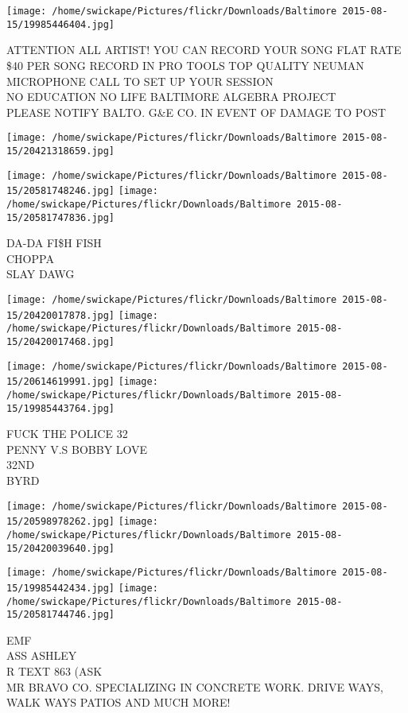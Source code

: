 \documentclass[10pt,letterpaper]{article}
\begin{document}
\texttt{[image: /home/swickape/Pictures/flickr/Downloads/Baltimore 2015-08-15/19985446404.jpg]}

ATTENTION ALL ARTIST!  YOU CAN RECORD YOUR SONG FLAT RATE \$40 PER SONG RECORD IN PRO TOOLS TOP QUALITY NEUMAN MICROPHONE CALL TO SET UP YOUR SESSION\\
NO EDUCATION NO LIFE BALTIMORE ALGEBRA PROJECT\\
PLEASE NOTIFY BALTO. G\&E CO. IN EVENT OF DAMAGE TO POST
\pagebreak

\texttt{[image: /home/swickape/Pictures/flickr/Downloads/Baltimore 2015-08-15/20421318659.jpg]}

\vspace{0.25in}
\texttt{[image: /home/swickape/Pictures/flickr/Downloads/Baltimore 2015-08-15/20581748246.jpg]}
\texttt{[image: /home/swickape/Pictures/flickr/Downloads/Baltimore 2015-08-15/20581747836.jpg]}

DA{-}DA FI\$H FISH\\
CHOPPA\\
SLAY DAWG
\pagebreak

\texttt{[image: /home/swickape/Pictures/flickr/Downloads/Baltimore 2015-08-15/20420017878.jpg]}
\texttt{[image: /home/swickape/Pictures/flickr/Downloads/Baltimore 2015-08-15/20420017468.jpg]}

\texttt{[image: /home/swickape/Pictures/flickr/Downloads/Baltimore 2015-08-15/20614619991.jpg]}
\texttt{[image: /home/swickape/Pictures/flickr/Downloads/Baltimore 2015-08-15/19985443764.jpg]}

FUCK THE POLICE 32\\
PENNY V.S BOBBY LOVE\\
32ND\\
BYRD
\pagebreak

\texttt{[image: /home/swickape/Pictures/flickr/Downloads/Baltimore 2015-08-15/20598978262.jpg]}
\texttt{[image: /home/swickape/Pictures/flickr/Downloads/Baltimore 2015-08-15/20420039640.jpg]}

\texttt{[image: /home/swickape/Pictures/flickr/Downloads/Baltimore 2015-08-15/19985442434.jpg]}
\texttt{[image: /home/swickape/Pictures/flickr/Downloads/Baltimore 2015-08-15/20581744746.jpg]}

EMF\\
ASS ASHLEY\\
R TEXT 863 (ASK\\
MR BRAVO CO. SPECIALIZING IN CONCRETE WORK.  DRIVE WAYS, WALK WAYS PATIOS AND MUCH MORE!
\pagebreak
\end{document}
